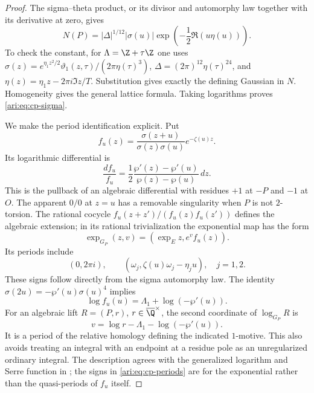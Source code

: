 \begin{proof}
The sigma--theta product, or its divisor and automorphy law
together with its derivative at zero, gives
\begin{equation}\label{ari:eq:cp-klein}
 N(P)=|\Delta|^{1/12}|\sigma(u)|
                   \exp\!\left(-\frac12\Re(u\eta(u))\right).
\end{equation}
To check the constant, for $\Lambda=\Z+\tau\Z$ one uses
$\sigma(z)=e^{\eta_1z^2/2}\vartheta_1(z,\tau)/(2\pi\eta(\tau)^3)$,
$\Delta=(2\pi)^{12}\eta(\tau)^{24}$, and
$\eta(z)=\eta_1z-2\pi i\Im z/T$. Substitution gives exactly
the defining Gaussian in $N$. Homogeneity gives the general
lattice formula. Taking logarithms proves \eqref{ari:eq:cp-sigma}.

We make the period identification explicit. Put
\[
 f_u(z)=\frac{\sigma(z+u)}{\sigma(z)\sigma(u)}e^{-\zeta(u)z}.
\]
Its logarithmic differential is
\[
 \frac{df_u}{f_u}
 =\frac12\frac{\wp'(z)-\wp'(u)}{\wp(z)-\wp(u)}\,dz.
\]
This is the pullback of an algebraic differential with residues
$+1$ at $-P$ and $-1$ at $O$. The apparent $0/0$ at $z=u$
has a removable singularity when $P$ is not $2$-torsion.
The rational cocycle $f_u(z+z')/(f_u(z)f_u(z'))$ defines
the algebraic extension; in its rational trivialization the
exponential map has the form
\[
 \exp_{G_P}(z,v)=(\exp_E z,e^v f_u(z)).
\]
Its periods include
\begin{equation}\label{ari:eq:cp-periods}
 (0,2\pi i),\qquad
 (\omega_j,\zeta(u)\omega_j-\eta_j u),\quad j=1,2.
\end{equation}
These signs follow directly from the sigma automorphy law.
The identity
$\sigma(2u)=-\wp'(u)\sigma(u)^4$ implies
\[
 \log f_u(u)=\Lambda_1+\log(-\wp'(u)).
\]
For an algebraic lift $R=(P,r)$, $r\in\overline\Q^{\times}$,
the second coordinate of $\log_{G_P}R$ is
\begin{equation}\label{ari:eq:cp-v}
 v=\log r-\Lambda_1-\log(-\wp'(u)).
\end{equation}
It is a period of the relative homology defining the indicated
$1$-motive. This also avoids treating an integral with an endpoint
at a residue pole as an unregularized ordinary integral.
The description agrees with the generalized logarithm and
Serre function in \citet[Definitions 2.3--2.4 and
Section 6]{bertolin2022}; the signs in
\eqref{ari:eq:cp-periods} are for the exponential rather than the
quasi-periods of $f_u$ itself.
\end{proof}

